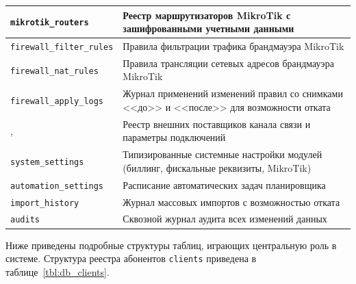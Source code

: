 \begin{xltabular}{\textwidth}{|p{4.2cm}|X|}
\texttt{mikrotik\_routers} & Реестр маршрутизаторов MikroTik с зашифрованными учетными данными \\ \hline
\texttt{firewall\_filter\_rules} & Правила фильтрации трафика брандмауэра MikroTik \\ \hline
\texttt{firewall\_nat\_rules} & Правила трансляции сетевых адресов брандмауэра MikroTik \\ \hline
\texttt{firewall\_apply\_logs} & Журнал применений изменений правил со снимками <<до>> и <<после>> для возможности отката \\ \hline
{},  & Реестр внешних поставщиков канала связи и параметры подключений \\ \hline
\texttt{system\_settings} & Типизированные системные настройки модулей (биллинг, фискальные реквизиты, MikroTik) \\ \hline
\texttt{automation\_settings} & Расписание автоматических задач планировщика \\ \hline
\texttt{import\_history} & Журнал массовых импортов с возможностью отката \\ \hline
\texttt{audits} & Сквозной журнал аудита всех изменений данных
\end{xltabular}

Ниже приведены подробные структуры таблиц, играющих центральную роль в системе. Структура реестра абонентов \texttt{clients} приведена в таблице~\ref{tbl:db_clients}.

